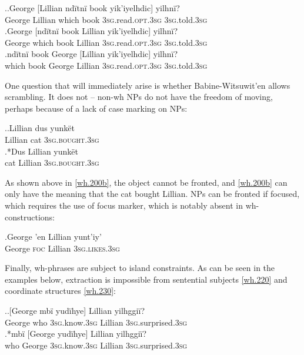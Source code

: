 \documentclass{glossa}
\begin{document}
\ex.\ag.\label{wh.190a}George [Lillian nd\"itn\"i book yik'iyelhdic] yilhn\"i?\\
   George Lillian which book \textsc{3sg}.read.\textsc{opt.3sg} \textsc{3sg}.told.\textsc{3sg}\\
   \bg.\label{wh.190b}George [nd\"itn\"i book Lillian yik'iyelhdic] yilhn\"i?\\
   George which book Lillian \textsc{3sg}.read.\textsc{opt.3sg} \textsc{3sg}.told.\textsc{3sg}\\
   \bg.\label{wh.190c}nd\"itn\"i book George [Lillian yik'iyelhdic] yilhn\"i?\\
   which book George Lillian \textsc{3sg}.read.\textsc{opt.3sg} \textsc{3sg}.told.\textsc{3sg}\\

One question that will immediately arise is whether Babine-Witsuwit'en allows scrambling. It does not -- non-wh NPs do not have the freedom of moving, perhaps because of a lack of case marking on NPs:

\ex.\ag.\label{wh.200a}Lillian dus yunk\"et\\
   Lillian cat \textsc{3sg.bought.3sg}\\
   \bg.*\label{wh.200b}Dus Lillian yunk\"et\\
   cat Lillian \textsc{3sg.bought.3sg}\\

As shown above in \ref{wh.200b}, the object cannot be fronted, and \ref{wh.200b} can only have the meaning that the cat bought Lillian. NPs can be fronted if focused, which requires the use of focus marker, which is notably absent in wh-constructions:

\exg.\label{wh.210}George 'en Lillian yunt'iy'\\
   George \textsc{foc} Lillian \textsc{3sg.likes.3sg}\\

Finally, wh-phrases are subject to island constraints. As can be seen in the examples below, extraction is impossible from sentential subjects \ref{wh.220} and coordinate structures \ref{wh.230}:

\ex.\label{wh.220}\ag.{}[George mb\"i yud\"ihye] Lillian yilhggi\"i?\\
   George who \textsc{3sg}.know.\textsc{3sg} Lillian \textsc{3sg}.surprised.\textsc{3sg}\\
   \bg.*mb\"i [George yud\"ihye] Lillian yilhggi\"i?\\
   who George \textsc{3sg}.know.\textsc{3sg} Lillian \textsc{3sg}.surprised.\textsc{3sg}\\
\end{document}
